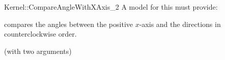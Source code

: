 \begin{ccRefFunctionObjectConcept}{Kernel::CompareAngleWithXAxis_2}
A model for this must provide:


 {compares
  the angles between the positive $x$-axis and the directions in
  counterclockwise order.}

\ccRefines
{} (with two arguments)

\end{ccRefFunctionObjectConcept}
